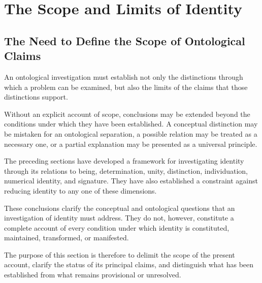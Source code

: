 %
%
%
%

\section{The Scope and Limits of Identity}
\label{sec:scope-and-limits-of-identity}

\subsection{The Need to Define the Scope of Ontological Claims}

An ontological investigation must establish not only the
distinctions through which a problem can be examined, but also
the limits of the claims that those distinctions support.

Without an explicit account of scope, conclusions may be
extended beyond the conditions under which they have been
established. A conceptual distinction may be mistaken for an
ontological separation, a possible relation may be treated
as a necessary one, or a partial explanation may be presented
as a universal principle.

The preceding sections have developed a framework for
investigating identity through its relations to being,
determination, unity, distinction, individuation, numerical
identity, and signature. They have also established a
constraint against reducing identity to any one of these
dimensions.

These conclusions clarify the conceptual and ontological
questions that an investigation of identity must address.
They do not, however, constitute a complete account of every
condition under which identity is constituted, maintained,
transformed, or manifested.

The purpose of this section is therefore to delimit the
scope of the present account, clarify the status of its
principal claims, and distinguish what has been established
from what remains provisional or unresolved.

